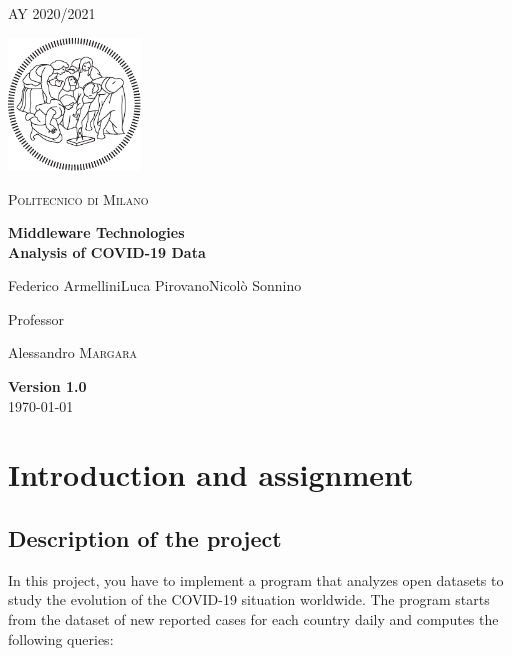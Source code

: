 \documentclass[table, 12pt]{article}
\begin{document}
\begin{titlepage}
		\centering
		{\scshape\large AY 2020/2021 \par}
		\vfill
		\includegraphics[width=100pt]{assets/logo-polimi-new}\par\vspace{1cm}
		{\scshape\LARGE Politecnico di Milano \par}
		\vspace{1.5cm}
		{\huge\bfseries Middleware Technologies\\Analysis of COVID-19 Data\par}
		\vspace{2cm}
		{\Large {Federico Armellini\quad Luca Pirovano\quad Nicolò Sonnino}\par}
		\vfill
		{\large Professor\par
			Alessandro \textsc{Margara}}
		\vfill
		{\large \textbf{Version 1.0}\\ \today \par}
	\end{titlepage}

	\thispagestyle{plain}
	\mbox{}
	\newpage
	\tableofcontents
	\newpage
	
	
\section{Introduction and assignment}
\subsection{Description of the project}
In this project, you have to implement a program that analyzes open datasets to study the evolution of the
COVID-19 situation worldwide. The program starts from the dataset of new reported cases for each country
daily and computes the following queries:
\end{document}
